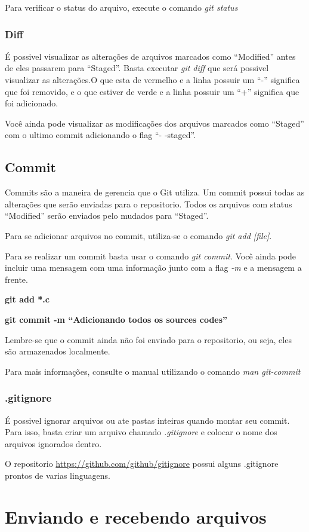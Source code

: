 \documentclass[]{article}
\begin{document}
Para verificar o status do arquivo, execute o comando \textit{git status}
\subsubsection*{Diff}
É possivel visualizar as alterações de arquivos marcados como ``Modified'' antes de eles passarem para ``Staged''. Basta executar \textit{git diff} que será possivel visualizar as alterações.O que esta de vermelho e a linha possuir um ``-'' significa que foi removido, e o que estiver de verde e a linha possuir um ``+'' significa que foi adicionado.

Você ainda pode visualizar as modificações dos arquivos marcados como ``Staged'' com o ultimo commit adicionando o flag ``- -staged''.

\subsection*{Commit}
Commits são a maneira de gerencia que o Git utiliza. Um commit possui todas as alterações que serão enviadas para o repositorio.
Todos os arquivos com status ``Modified'' serão enviados pelo mudados para ``Staged''.

 Para se adicionar arquivos no commit, utiliza-se o comando \textit{git add [file]}.

 Para se realizar um commit basta usar o comando \textit{git commit}. Você ainda pode incluir uma mensagem com uma informação junto com a flag \textit{-m} e a mensagem a frente.

 
 \textbf{git add *.c}


 \textbf{git commit -m ``Adicionando todos os sources codes''}

 Lembre-se que o commit ainda não foi enviado para o repositorio, ou seja, eles são armazenados localmente.

 Para mais informações, consulte o manual utilizando o comando \textit{man git-commit}
 \subsubsection*{.gitignore}
 É possivel ignorar arquivos ou ate pastas inteiras quando montar seu commit. Para isso, basta criar um arquivo chamado \textit{.gitignore} e colocar o nome dos arquivos ignorados dentro.

 O repositorio \url{https://github.com/github/gitignore} possui alguns .gitignore prontos de varias linguagens.

 
\section{Enviando e recebendo arquivos}
\end{document}
